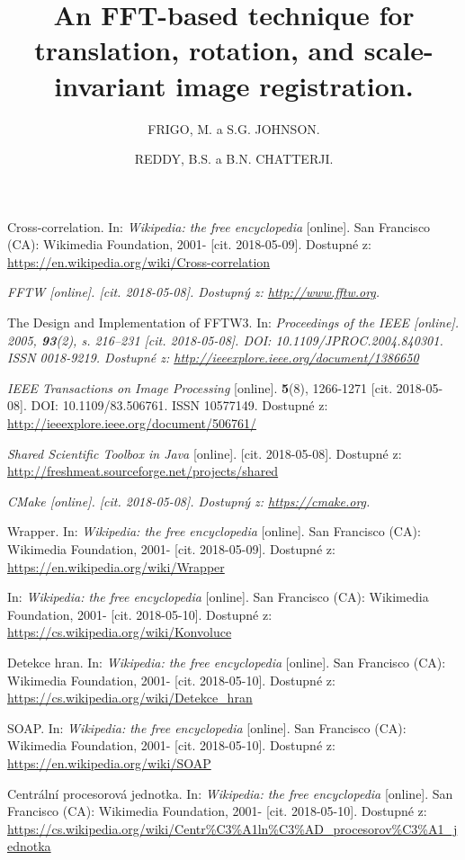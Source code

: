 \documentclass[a4paper,12pt]{article}
\begin{document}
{  Cross-correlation. In: \textit{Wikipedia: the free encyclopedia} [online]. San Francisco (CA): Wikimedia Foundation, 2001- [cit. 2018-05-09]. Dostupné z: \url{https://en.wikipedia.org/wiki/Cross-correlation}
  
  \it{FFTW} [online]. [cit. 2018-05-08]. Dostupný z: \url{http://www.fftw.org}.
  
   \author{FRIGO, M. a S.G. JOHNSON.} The Design and Implementation of FFTW3. In: \it{Proceedings of the IEEE} [online]. 2005, \textbf{93}(2), s. 216--231 [cit. 2018-05-08]. DOI: 10.1109/JPROC.2004.840301. ISSN 0018-9219. Dostupné z: \url{http://ieeexplore.ieee.org/document/1386650}
  
   \author{REDDY, B.S. a B.N. CHATTERJI.} \title{An FFT-based technique for translation, rotation, and scale-invariant image registration.} \textit{IEEE Transactions on Image Processing} [online]. \textbf{5}(8), 1266-1271 [cit. 2018-05-08]. DOI: 10.1109/83.506761. ISSN 10577149. Dostupné z: \url{http://ieeexplore.ieee.org/document/506761/}
  
  \textit{Shared Scientific Toolbox in Java} [online]. [cit. 2018-05-08]. Dostupné z: \url{http://freshmeat.sourceforge.net/projects/shared}
    
  \it{CMake} [online]. [cit. 2018-05-08]. Dostupný z: \url{https://cmake.org}.
  
  Wrapper. In: \textit{Wikipedia: the free encyclopedia} [online]. San Francisco (CA): Wikimedia Foundation, 2001- [cit. 2018-05-09]. Dostupné z: \url{https://en.wikipedia.org/wiki/Wrapper}
  
  In: \textit{Wikipedia: the free encyclopedia} [online]. San Francisco (CA): Wikimedia Foundation, 2001- [cit. 2018-05-10]. Dostupné z: \url{https://cs.wikipedia.org/wiki/Konvoluce}
  
  Detekce hran. In: \textit{Wikipedia: the free encyclopedia} [online]. San Francisco (CA): Wikimedia Foundation, 2001- [cit. 2018-05-10]. Dostupné z: \url{https://cs.wikipedia.org/wiki/Detekce_hran}
  
  SOAP. In: \textit{Wikipedia: the free encyclopedia} [online]. San Francisco (CA): Wikimedia Foundation, 2001- [cit. 2018-05-10]. Dostupné z: \url{https://en.wikipedia.org/wiki/SOAP}
  
  Centrální procesorová jednotka. In: \textit{Wikipedia: the free encyclopedia} [online]. San Francisco (CA): Wikimedia Foundation, 2001- [cit. 2018-05-10]. Dostupné z: \url{https://cs.wikipedia.org/wiki/Centr\%C3\%A1ln\%C3\%AD_procesorov\%C3\%A1_jednotka}
  
}
\end{document}
